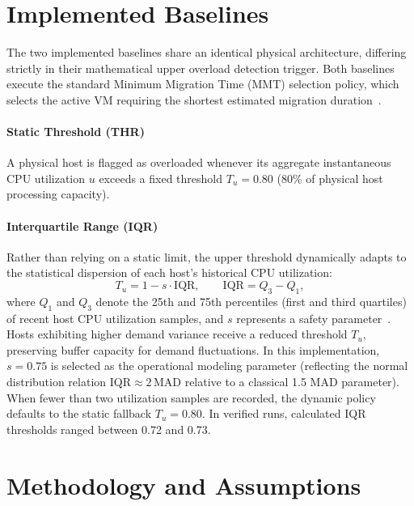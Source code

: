 \documentclass[11pt,a4paper]{article}
\begin{document}
\section{Implemented Baselines}
The two implemented baselines share an identical physical architecture, differing strictly in their mathematical upper overload detection trigger. Both baselines execute the standard Minimum Migration Time (MMT) selection policy, which selects the active VM requiring the shortest estimated migration duration~\cite{beloglazov2012ccpe}.

\paragraph{Static Threshold (THR)} A physical host is flagged as overloaded whenever its aggregate instantaneous CPU utilization $u$ exceeds a fixed threshold $T_u = 0.80$ (80\% of physical host processing capacity).

\paragraph{Interquartile Range (IQR)} Rather than relying on a static limit, the upper threshold dynamically adapts to the statistical dispersion of each host's historical CPU utilization:
\begin{equation}
T_u = 1 - s \cdot \mathrm{IQR}, \qquad \mathrm{IQR} = Q_3 - Q_1,
\end{equation}
where $Q_1$ and $Q_3$ denote the 25th and 75th percentiles (first and third quartiles) of recent host CPU utilization samples, and $s$ represents a safety parameter~\cite{beloglazov2012ccpe}. Hosts exhibiting higher demand variance receive a reduced threshold $T_u$, preserving buffer capacity for demand fluctuations. In this implementation, $s = 0.75$ is selected as the operational modeling parameter (reflecting the normal distribution relation $\mathrm{IQR} \approx 2\,\mathrm{MAD}$ relative to a classical 1.5 MAD parameter). When fewer than two utilization samples are recorded, the dynamic policy defaults to the static fallback $T_u = 0.80$. In verified runs, calculated IQR thresholds ranged between 0.72 and 0.73.

\section{Methodology and Assumptions}
\end{document}
